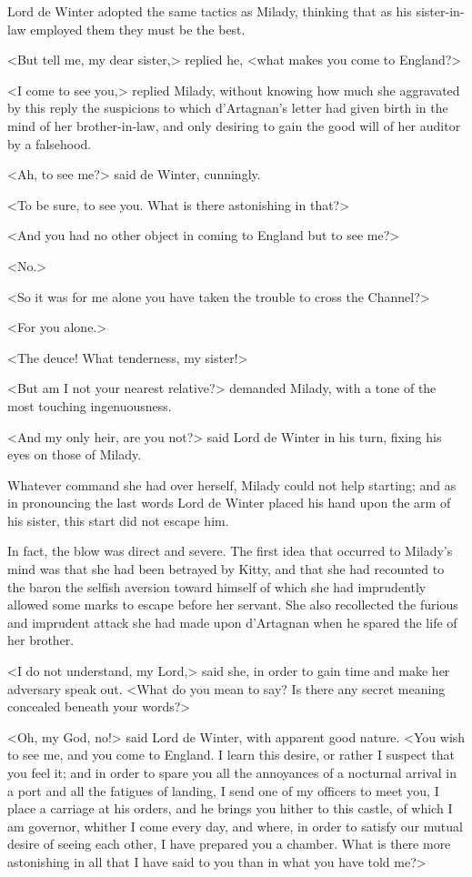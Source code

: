 Lord de Winter adopted the same tactics as Milady, thinking that as his sister-in-law employed them they must be the best. 

<But tell me, my dear sister,> replied he, <what makes you come to England?> 

<I come to see you,> replied Milady, without knowing how much she aggravated by this reply the suspicions to which d'Artagnan's letter had given birth in the mind of her brother-in-law, and only desiring to gain the good will of her auditor by a falsehood. 

<Ah, to see me?> said de Winter, cunningly. 

<To be sure, to see you. What is there astonishing in that?> 

<And you had no other object in coming to England but to see me?> 

<No.> 

<So it was for me alone you have taken the trouble to cross the Channel?> 

<For you alone.> 

<The deuce! What tenderness, my sister!> 

<But am I not your nearest relative?> demanded Milady, with a tone of the most touching ingenuousness. 

<And my only heir, are you not?> said Lord de Winter in his turn, fixing his eyes on those of Milady. 

Whatever command she had over herself, Milady could not help starting; and as in pronouncing the last words Lord de Winter placed his hand upon the arm of his sister, this start did not escape him. 

In fact, the blow was direct and severe. The first idea that occurred to Milady's mind was that she had been betrayed by Kitty, and that she had recounted to the baron the selfish aversion toward himself of which she had imprudently allowed some marks to escape before her servant. She also recollected the furious and imprudent attack she had made upon d'Artagnan when he spared the life of her brother. 

<I do not understand, my Lord,> said she, in order to gain time and make her adversary speak out. <What do you mean to say? Is there any secret meaning concealed beneath your words?> 

<Oh, my God, no!> said Lord de Winter, with apparent good nature. <You wish to see me, and you come to England. I learn this desire, or rather I suspect that you feel it; and in order to spare you all the annoyances of a nocturnal arrival in a port and all the fatigues of landing, I send one of my officers to meet you, I place a carriage at his orders, and he brings you hither to this castle, of which I am governor, whither I come every day, and where, in order to satisfy our mutual desire of seeing each other, I have prepared you a chamber. What is there more astonishing in all that I have said to you than in what you have told me?> 

